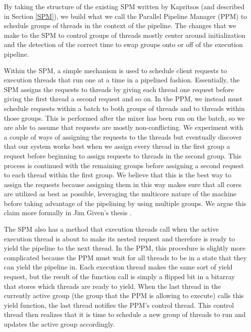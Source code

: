 \documentclass[11pt, oneside]{report}
\begin{document}
By taking the structure of the existing SPM written by Kapritsos (and described in Section \ref{SPM}), we build what we call the Parallel Pipeline Manager (PPM) to schedule groups of threads in the context of the pipeline.
The changes that we make to the SPM to control groups of threads mostly center around initialization and the detection of the correct time to swap groups onto or off of the execution pipeline.

Within the SPM, a simple mechanism is used to schedule client requests to execution threads that run one at a time in a pipelined fashion.
Essentially, the SPM assigns the requests to threads by giving each thread one request before giving the first thread a second request and so on. 
In the PPM, we instead must schedule requests within a batch to both groups of threads and to threads within those groups. 
This is performed after the mixer has been run on the batch, so we are able to assume that requests are mostly non-conflicting. 
We experiment with a couple of ways of assigning the requests to the threads but eventually discover that our system works best when we assign every thread in the first group a request before beginning to assign requests to threads in the second group.
This process is continued with the remaining groups before assigning a second request to each thread within the first group. 
We believe that this is the best way to assign the requests because assigning them in this way makes sure that all cores are utilized as best as possible, leveraging the multicore nature of the machine before taking advantage of the pipelining by using multiple groups. 
We argue this claim more formally in Jim Given's thesis \cite{jim}.

The SPM also has a method that execution threads call when the active execution thread is about to make its nested request and therefore is ready to yield the pipeline to the next thread. 
In the PPM, this procedure is slightly more complicated because the PPM must wait for all threads to be in a state that they can yield the pipeline in. 
Each execution thread makes the same sort of yield request, but the result of the function call is simply a flipped bit in a bitarray that stores which threads are ready to yield. 
When the last thread in the currently active group (the group that the PPM is allowing to execute) calls this yield function, the last thread notifies the PPM's control thread.
This control thread then realizes that it is time to schedule a new group of threads to run and updates the active group accordingly. 
\end{document}

